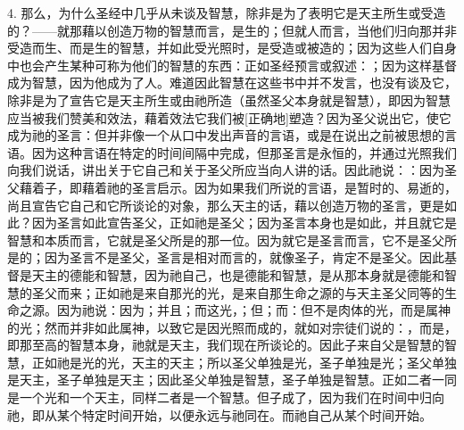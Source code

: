 4. 那么，为什么圣经中几乎从未谈及智慧，除非是为了表明它是天主所生或受造的？——就那藉以创造万物的智慧而言，是生的；但就人而言，当他们归向那并非受造而生、而是生的智慧，并如此受光照时，是受造或被造的；因为这些人们自身中也会产生某种可称为他们的智慧的东西：正如圣经预言或叙述：；因为这样基督成为智慧，因为他成为了人。难道因此智慧在这些书中并不发言，也没有谈及它，除非是为了宣告它是天主所生或由祂所造（虽然圣父本身就是智慧），即因为智慧应当被我们赞美和效法，藉着效法它我们被[正确地]塑造？因为圣父说出它，使它成为祂的圣言：但并非像一个从口中发出声音的言语，或是在说出之前被思想的言语。因为这种言语在特定的时间间隔中完成，但那圣言是永恒的，并通过光照我们向我们说话，讲出关于它自己和关于圣父所应当向人讲的话。因此祂说：：因为圣父藉着子，即藉着祂的圣言启示。因为如果我们所说的言语，是暂时的、易逝的，尚且宣告它自己和它所谈论的对象，那么天主的话，藉以创造万物的圣言，更是如此？因为圣言如此宣告圣父，正如祂是圣父；因为圣言本身也是如此，并且就它是智慧和本质而言，它就是圣父所是的那一位。因为就它是圣言而言，它不是圣父所是的；因为圣言不是圣父，圣言是相对而言的，就像圣子，肯定不是圣父。因此基督是天主的德能和智慧，因为祂自己，也是德能和智慧，是从那本身就是德能和智慧的圣父而来；正如祂是来自那光的光，是来自那生命之源的与天主圣父同等的生命之源。因为祂说：因为；并且；而这光，；但；而：但不是肉体的光，而是属神的光；然而并非如此属神，以致它是因光照而成的，就如对宗徒们说的：，而是，即那至高的智慧本身，祂就是天主，我们现在所谈论的。因此子来自父是智慧的智慧，正如祂是光的光，天主的天主；所以圣父单独是光，圣子单独是光；圣父单独是天主，圣子单独是天主；因此圣父单独是智慧，圣子单独是智慧。正如二者一同是一个光和一个天主，同样二者是一个智慧。但子成了，因为我们在时间中归向祂，即从某个特定时间开始，以便永远与祂同在。而祂自己从某个时间开始。\par

